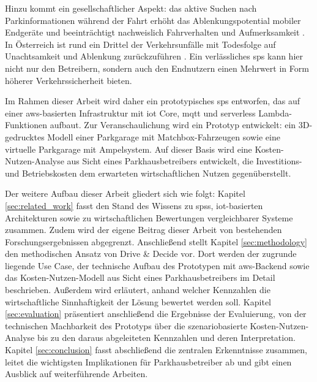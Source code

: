 Hinzu kommt ein gesellschaftlicher Aspekt: das aktive Suchen nach Parkinformationen während der Fahrt erhöht das Ablenkungspotential mobiler Endgeräte und beeinträchtigt nachweislich Fahrverhalten und Aufmerksamkeit \citep{oviedo-trespalaciosUnderstandingImpactsMobile2016}.
In Österreich ist rund ein Drittel der Verkehrsunfälle mit Todesfolge auf Unachtsamkeit und Ablenkung zurückzuführen \citep{bmi397VerkehrstoteAuf2026}.
Ein verlässliches \ac{sps} kann hier nicht nur den Betreibern, sondern auch den Endnutzern einen Mehrwert in Form höherer Verkehrssicherheit bieten.

Im Rahmen dieser Arbeit wird daher ein prototypisches \ac{sps} entworfen, das auf einer \ac{aws}-basierten Infrastruktur mit \ac{iot} Core, \ac{mqtt} und serverless Lambda-Funktionen aufbaut. Zur Veranschaulichung wird ein Prototyp entwickelt: ein 3D-gedrucktes Modell einer Parkgarage mit Matchbox-Fahrzeugen sowie eine virtuelle Parkgarage mit Ampelsystem. Auf dieser Basis wird eine Kosten-Nutzen-Analyse aus Sicht eines Parkhausbetreibers entwickelt, die Investitions- und Betriebskosten dem erwarteten wirtschaftlichen Nutzen gegenüberstellt.

Der weitere Aufbau dieser Arbeit gliedert sich wie folgt: Kapitel \ref{sec:related_work} fasst den Stand des Wissens zu \acp{sps}, \ac{iot}-basierten Architekturen sowie zu wirtschaftlichen Bewertungen vergleichbarer Systeme zusammen.
Zudem wird der eigene Beitrag dieser Arbeit von bestehenden Forschungsergebnissen abgegrenzt.
Anschließend stellt Kapitel \ref{sec:methodology} den methodischen Ansatz von Drive \& Decide vor.
Dort werden der zugrunde liegende Use Case, der technische Aufbau des Prototypen mit \ac{aws}-Backend sowie das Kosten-Nutzen-Modell aus Sicht eines Parkhausbetreibers im Detail beschrieben. Außerdem wird erläutert, anhand welcher Kennzahlen die wirtschaftliche Sinnhaftigkeit der Lösung bewertet werden soll.
Kapitel \ref{sec:evaluation} präsentiert anschließend die Ergebnisse der Evaluierung, von der technischen Machbarkeit des Prototyps über die szenariobasierte Kosten-Nutzen-Analyse bis zu den daraus abgeleiteten Kennzahlen und deren Interpretation.
Kapitel \ref{sec:conclusion} fasst abschließend die zentralen Erkenntnisse zusammen, leitet die wichtigsten Implikationen für Parkhausbetreiber ab und gibt einen Ausblick auf weiterführende Arbeiten.
